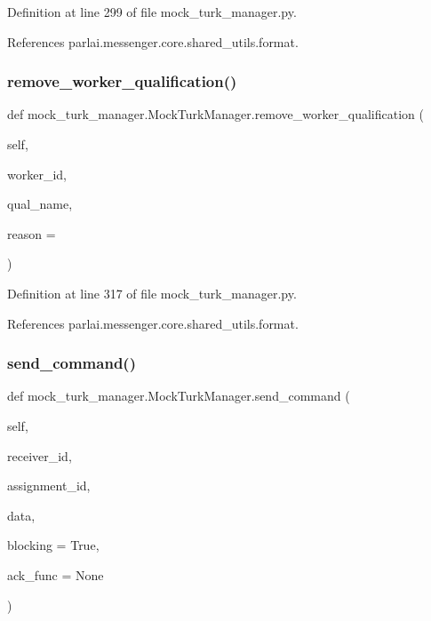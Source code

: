 Definition at line 299 of file mock\+\_\+turk\+\_\+manager.\+py.



References parlai.\+messenger.\+core.\+shared\+\_\+utils.\+format.

\mbox{\label{classmock__turk__manager_1_1MockTurkManager_a3fe1f5b71470e63e9c4339bed5f8486f}} 
\subsubsection{\texorpdfstring{remove\+\_\+worker\+\_\+qualification()}{remove\_worker\_qualification()}}
{\footnotesize\ttfamily def mock\+\_\+turk\+\_\+manager.\+Mock\+Turk\+Manager.\+remove\+\_\+worker\+\_\+qualification (\begin{DoxyParamCaption}\item[{}]{self,  }\item[{}]{worker\+\_\+id,  }\item[{}]{qual\+\_\+name,  }\item[{}]{reason = {\ttfamily \textquotesingle{}\textquotesingle{}} }\end{DoxyParamCaption})}



Definition at line 317 of file mock\+\_\+turk\+\_\+manager.\+py.



References parlai.\+messenger.\+core.\+shared\+\_\+utils.\+format.

\mbox{\label{classmock__turk__manager_1_1MockTurkManager_a449a0fd9facd766c52565185f2f26054}} 
\subsubsection{\texorpdfstring{send\+\_\+command()}{send\_command()}}
{\footnotesize\ttfamily def mock\+\_\+turk\+\_\+manager.\+Mock\+Turk\+Manager.\+send\+\_\+command (\begin{DoxyParamCaption}\item[{}]{self,  }\item[{}]{receiver\+\_\+id,  }\item[{}]{assignment\+\_\+id,  }\item[{}]{data,  }\item[{}]{blocking = {\ttfamily True},  }\item[{}]{ack\+\_\+func = {\ttfamily None} }\end{DoxyParamCaption})}

